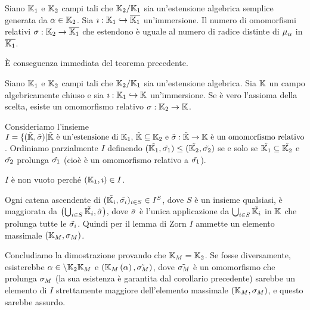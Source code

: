 \begin{Corollary}
	Siano $\mathbb{K}_1$ e $\mathbb{K}_2$ campi tali che $\mathbb{K}_2/\mathbb{K}_1$ sia un'estensione algebrica semplice generata da $\alpha \in \mathbb{K}_2$. Sia $\imath: \mathbb{K}_1 \hookrightarrow \overline{\mathbb{K}_1}$ un'immersione. Il numero di omomorfismi relativi $\sigma: \mathbb{K}_2 \rightarrow \overline{\mathbb{K}_1}$ che estendono \`e uguale al numero di radice distinte di $\MinimalPolynomial{\alpha}$ in $\overline{\mathbb{K}_1}$.
\end{Corollary}
\Proof \`E conseguenza immediata del teorema precedente. \EndProof
\begin{Theorem}
	Siano $\mathbb{K}_1$ e $\mathbb{K}_2$ campi tali che $\mathbb{K}_2/\mathbb{K}_1$ sia un'estensione algebrica. Sia $\mathbb{K}$ un campo algebricamente chiuso e sia $\imath: \mathbb{K}_1 \hookrightarrow \mathbb{K}$ un'immersione. Se \`e vero l'assioma della scelta, esiste un omomorfismo relativo $\sigma: \mathbb{K}_2 \rightarrow \mathbb{K}$.
\end{Theorem}
\Proof Consideriamo l'insieme $I = \lbrace (\tilde{\mathbb{K}},\tilde{\sigma}) | \text{$\tilde{\mathbb{K}}$ \`e un'estensione di $\mathbb{K}_1$, $\tilde{\mathbb{K}} \subseteq \mathbb{K}_2$ e $\tilde{\sigma}: \tilde{\mathbb{K}} \rightarrow \mathbb{K}$ \`e un omomorfismo relativo}$. Ordiniamo parzialmente $I$ definendo $(\tilde{\mathbb{K}_1},\tilde{\sigma_1}) \leq (\tilde{\mathbb{K}_2},\tilde{\sigma_2})$ se e solo se $\tilde{\mathbb{K}_1} \subseteq \tilde{\mathbb{K}_2}$ e $\tilde{\sigma_2}$ prolunga $\tilde{\sigma_1}$ (cio\`e \`e un omomorfismo relativo a $\tilde{\sigma_1}$).
\par $I$ \`e non vuoto perch\'e $(\mathbb{K}_1,\imath) \in I$.
\par Ogni catena ascendente di $(\tilde{\mathbb{K}_i},\tilde{\sigma_i})_{i \in S} \in I^S$, dove $S$ \`e un insieme qualsiasi, \`e maggiorata da $\left ( \bigcup_{i \in S} \tilde{\mathbb{K}_i}, \tilde{\sigma} \right )$, dove $\tilde{\sigma}$ \`e l'unica applicazione da $\bigcup_{i \in S} \tilde{\mathbb{K}_i}$ in $\mathbb{K}$ che prolunga tutte le $\tilde{\sigma_i}$. Quindi per il lemma di Zorn $I$ ammette un elemento massimale $(\mathbb{K}_M,\sigma_M)$.
\par Concludiamo la dimostrazione provando che $\mathbb{K}_M = \mathbb{K}_2$. Se fosse diversamente, esisterebbe $\alpha \in \setminus{\mathbb{K}_2}{\mathbb{K}_M}$ e $(\mathbb{K}_M \left ( \alpha \right ),\tilde{\sigma_M})$, dove $\tilde{\sigma_M}$ \`e un omomorfismo che prolunga $\sigma_M$ (la sua esistenza \`e garantita dal corollario precedente) sarebbe un elemento di $I$ strettamente maggiore dell'elemento massimale $(\mathbb{K}_M,\sigma_M)$, e questo sarebbe assurdo. \EndProof
